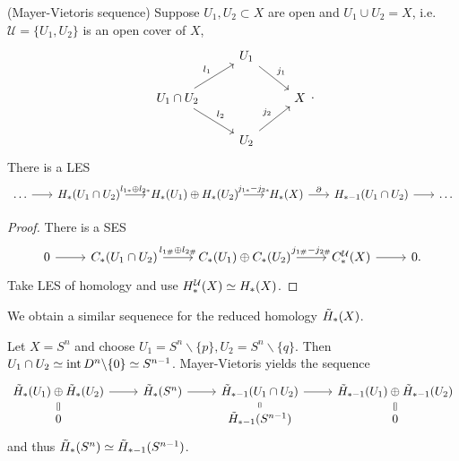 \documentclass[a4paper,11pt]{article}
\begin{document}
				\begin{prop}(Mayer-Vietoris sequence)
					Suppose $U_1,U_2\subset X$ are open and $U_1\cup U_2=X$, i.e. $\mathcal{U}=\{U_1,U_2\}$ is an open cover of $X$,
					\begin{equation*}
						\begin{tikzcd}
							& U_1\ar[rd,"j_1"] & \\
							U_1\cap U_2\ar[ru,"l_1"]\ar[rd,"l_2"]& & X\\
							& U_2\ar[ru,"j_2"] &
						\end{tikzcd}.
					\end{equation*}
					There is a LES
					\begin{equation*}
						\begin{tikzcd}[column sep=scriptsize]
							\dots\ar[r]& \hg{U_1\cap U_2}\ar[r,"l_{1\ast}\oplus l_{2\ast}"]& \hg{U_1}\oplus\hg{U_2}\ar[r,"j_{1\ast}-j_{2\ast}"]& \hg{X}\ar[r,"\partial"]& \hg[\ast-1]{U_1\cap U_2}\ar[r]& \dots
						\end{tikzcd}
					\end{equation*}
				\end{prop}
				\begin{proof}
					There is a SES
					\begin{equation*}
						\begin{tikzcd}
							0\ar[r]& \cx{U_1\cap U_2}\ar[r,"l_{1\#}\oplus l_{2\#}"]& \cx{U_1}\oplus\cx{U_2}\ar[r,"j_{1\#}-j_{2\#}"]& C_\ast^\mathcal{U}(X)\ar[r]& 0.
						\end{tikzcd}
					\end{equation*}
					Take LES of homology and use $H_\ast^\mathcal{U}(X)\simeq\hg{X}$.
				\end{proof}

				We obtain a similar sequenece for the reduced homology $\rhg{X}$.

				\begin{eg}
					Let $X=S^n$ and choose $U_1=S^n\backslash\{p\},U_2=S^n\backslash\{q\}$. Then $U_1\cap U_2\simeq\inte D^n\backslash\{0\}\simeq S^{n-1}$. Mayer-Vietoris yields the sequence
					\begin{equation}
						\begin{tikzcd}[row sep=tiny]
							\rhg{U_1}\oplus\rhg{U_2}\ar[d,equal]\ar[r]& \rhg{S^n}\ar[r]& \rhg[\ast-1]{U_1\cap U_2}\ar[d,equal]\ar[r]& \rhg[\ast-1]{U_1}\oplus\rhg[\ast-1]{U_2}\ar[d,equal]\\
							0 & & \rhg[\ast-1]{S^{n-1}} & 0
						\end{tikzcd}
					\end{equation}
					and thus $\rhg{S^n}\simeq\rhg[\ast-1]{S^{n-1}}$.
				\end{eg}
\end{document}
